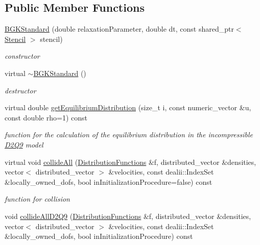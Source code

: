 \subsection*{Public Member Functions}
\begin{DoxyCompactItemize}
\item 
\hypertarget{classnatrium_1_1BGKStandard_a47cd5ef20c46be121f2e2306f2e6b05b}{
\hyperlink{classnatrium_1_1BGKStandard_a47cd5ef20c46be121f2e2306f2e6b05b}{BGKStandard} (double relaxationParameter, double dt, const shared\_\-ptr$<$ \hyperlink{classnatrium_1_1Stencil}{Stencil} $>$ stencil)}
\label{classnatrium_1_1BGKStandard_a47cd5ef20c46be121f2e2306f2e6b05b}

\begin{DoxyCompactList}\small\item\em constructor \item\end{DoxyCompactList}\item 
virtual \hyperlink{classnatrium_1_1BGKStandard_aa55035be79098a762cf4f0ef308d41e5}{$\sim$BGKStandard} ()
\begin{DoxyCompactList}\small\item\em destructor \item\end{DoxyCompactList}\item 
virtual double \hyperlink{classnatrium_1_1BGKStandard_a3d45ef2fe5536bf14914f99297477754}{getEquilibriumDistribution} (size\_\-t i, const numeric\_\-vector \&u, const double rho=1) const 
\begin{DoxyCompactList}\small\item\em function for the calculation of the equilibrium distribution in the incompressible \hyperlink{classnatrium_1_1D2Q9}{D2Q9} model \item\end{DoxyCompactList}\item 
virtual void \hyperlink{classnatrium_1_1BGKStandard_a8e0493b063d56275d7ee607e25c4145e}{collideAll} (\hyperlink{classnatrium_1_1DistributionFunctions}{DistributionFunctions} \&f, distributed\_\-vector \&densities, vector$<$ distributed\_\-vector $>$ \&velocities, const dealii::IndexSet \&locally\_\-owned\_\-dofs, bool inInitializationProcedure=false) const 
\begin{DoxyCompactList}\small\item\em function for collision \item\end{DoxyCompactList}\item 
\hypertarget{classnatrium_1_1BGKStandard_aaaad49afea2e7079645b49380d990254}{
void \hyperlink{classnatrium_1_1BGKStandard_aaaad49afea2e7079645b49380d990254}{collideAllD2Q9} (\hyperlink{classnatrium_1_1DistributionFunctions}{DistributionFunctions} \&f, distributed\_\-vector \&densities, vector$<$ distributed\_\-vector $>$ \&velocities, const dealii::IndexSet \&locally\_\-owned\_\-dofs, bool inInitializationProcedure) const }
\label{classnatrium_1_1BGKStandard_aaaad49afea2e7079645b49380d990254}


\end{DoxyCompactItemize}
